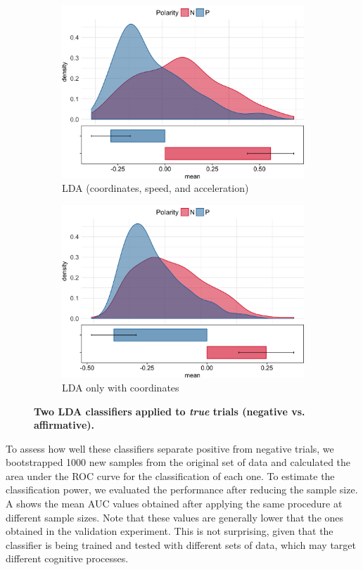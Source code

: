 \documentclass{article}
\begin{document}
\begin{figure}
\centering
\begin{subfigure}[b]{0.45\textwidth}
\includegraphics[width=\textwidth]{OriginalLDA-negation.png}
\caption{LDA (coordinates, speed, and acceleration) }
\end{subfigure}
\begin{subfigure}[b]{0.45\textwidth}
\includegraphics[width=\textwidth]{CoordsLDA-negation.png}
\caption{LDA only with coordinates}
\end{subfigure}
\caption{\textbf{Two LDA classifiers applied to \textit{true} trials (negative vs. affirmative).}  }
\label{fig:lda_negation}
\end{figure}

To assess how well these classifiers separate positive from negative trials, we bootstrapped 1000 new samples from the original set of data and calculated the area under the ROC curve for the classification of each one. 
To estimate the classification power, we evaluated the performance after reducing the sample size. A shows the mean AUC values obtained after applying the same procedure at different sample sizes. 
Note that these values are generally lower that the ones obtained in the validation experiment. This is not surprising, given that the classifier is being trained and tested with different sets of data, which may target different cognitive processes. 
\end{document}
